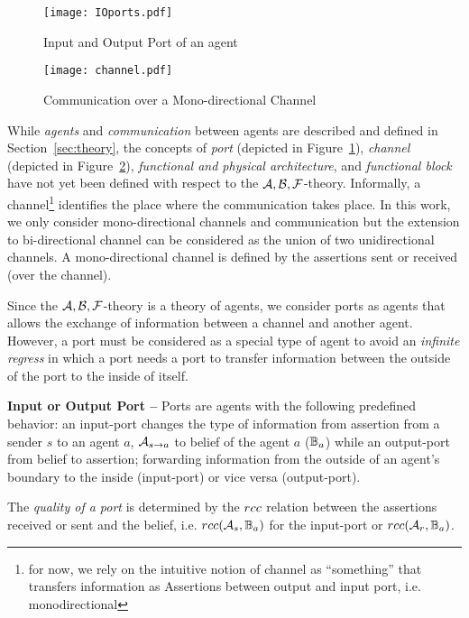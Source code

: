 \begin{figure}[t]
	\centering
	\texttt{[image: IOports.pdf]}
	\caption{Input and Output Port of an agent}
	\label{fig:ioports}
\end{figure}

\begin{figure}[t]
	\centering
	\texttt{[image: channel.pdf]}
	\caption{Communication over a Mono-directional Channel}
	\label{fig:channel}
\end{figure}

While \emph{agents} and \emph{communication} between agents are described and
defined in Section~\ref{sec:theory}, the concepts of \emph{port} (depicted in
Figure~\ref{fig:ioports}), \emph{channel} (depicted in
Figure~\ref{fig:channel}), \emph{functional and physical architecture}, and
\emph{functional block} have not yet been defined with respect to the
$\mathcal{A},\mathcal{B},\mathcal{F}$-theory.  Informally, a channel\footnote{for now, we rely on the
intuitive notion of channel as ``something'' that transfers information as
Assertions between output and input port, i.e. monodirectional} identifies the
place where the communication takes place.  In this work, we only consider
mono-directional channels and communication but the extension to bi-directional
channel can be considered as the union of two unidirectional channels. A
mono-directional channel is defined by the assertions sent or received (over
the channel). 

Since the $\mathcal{A},\mathcal{B},\mathcal{F}$-theory is a theory of agents, we consider ports as agents that
allows the exchange of information between a channel and another
agent.  However, a port must be considered as a special type of agent to avoid
an \emph{infinite regress} in which a port needs a port to transfer information
between the outside of the port to the inside of itself.

\begin{definition}{\bf Input or Output Port --}\label{def:port} 
	Ports are agents with the following predefined behavior: an input-port changes
	the type of information from assertion from a sender $s$ to an agent $a$,
	$\rassert{s}{a}$ to belief of the agent $a$ ($\mathbb{B}_a$) while an
	output-port from belief to assertion; forwarding information from the outside
	of an agent's boundary to the inside (input-port) or vice versa (output-port). 
\end{definition}
The \emph{quality of a port} is determined by the $rcc$ relation between the 
assertions received or sent and the belief, i.e. $rcc(\mathcal{A}_s,\mathbb{B}_a)$ for the input-port
or $rcc(\mathcal{A}_r,\mathbb{B}_a)$.

